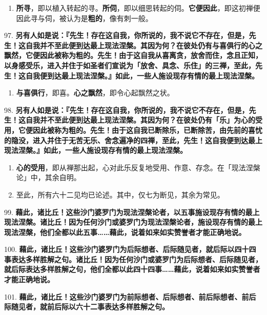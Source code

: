 \begin{enumerate}\item \textbf{所寻}，即以植入转起的寻。\textbf{所伺}，即以细思转起的伺。\textbf{它便因此}，即这初禅便因此寻与伺，被认为是\textbf{粗的}，像有刺一般。\end{enumerate}

{\Large 97.} \textbf{另有人如是说：『先生！存在这自我，你所说的，我不说它不存在，但是，先生！这自我并不至此便到达最上现法涅槃。其因为何？在彼处仍有与喜俱行的心之飘然，它便因此被称为粗的。先生！由于这自我从喜离贪，放舍而住，念且正知，以身感受乐，进入并住于如圣者们宣说为「放舍、具念、乐住」的三禅，至此，先生！这自我便到达最上现法涅槃。』如此，一些人施设现存有情的最上现法涅槃。}

\begin{enumerate}\item \textbf{与喜俱行}，即喜。\textbf{心之飘然}，即令心起飘然之状。\end{enumerate}

{\Large 98.} \textbf{另有人如是说：『先生！存在这自我，你所说的，我不说它不存在，但是，先生！这自我并不至此便到达最上现法涅槃。其因为何？在彼处仍有「乐」为心的受用，它便因此被称为粗的。先生！由于这自我已断除乐，已断除苦，由先前的喜忧的隐没，进入并住于无苦无乐、舍念遍净的四禅，至此，先生！这自我便到达最上现法涅槃。』如此，一些人施设现存有情的最上现法涅槃。}

\begin{enumerate}\item \textbf{心的受用}，即从禅那出起，心对此乐反复地受用、作意、存念。在「现法涅槃论」中，其余自明。
\item 至此，所有六十二见均已论述。其中，仅七为断见，其余为常见。\end{enumerate}

{\Large 99.} \textbf{藉此，诸比丘！这些沙门婆罗门为现法涅槃论者，以五事施设现存有情的最上现法涅槃。诸比丘！因为任何沙门或婆罗门为现法涅槃论者，施设现存有情的最上现法涅槃，他们全都以此五事……藉此，说着如来如实赞誉者才能正确地说。}

{\Large 100.} \textbf{藉此，诸比丘！这些沙门婆罗门为后际想者、后际随见者，就后际以四十四事表达多样胜解之句。诸比丘！因为任何沙门或婆罗门为后际想者、后际随见者，就后际表达多样胜解之句，他们全都以此四十四事……藉此，说着如来如实赞誉者才能正确地说。}

{\Large 101.} \textbf{藉此，诸比丘！这些沙门婆罗门为前际想者、后际想者、前后际想者、前后际随见者，就前后际以六十二事表达多样胜解之句。}

